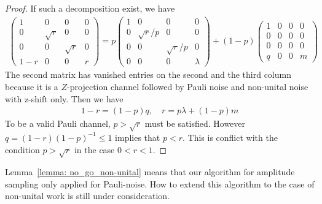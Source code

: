 \documentclass[aps]{revtex4-2}%
\begin{document}
\begin{proof}
    If such a decomposition exist, we have
    \begin{align}
        \begin{pmatrix}
            1&0&0&0\\
            0&\sqrt{r}&0&0\\
            0&0&\sqrt{r}&0\\
            1-r&0&0&r
        \end{pmatrix} =
        p\begin{pmatrix}
            1&0&0&0\\
            0&\sqrt{r}/p&0&0\\
            0&0&\sqrt{r}/p&0\\
            0&0&0&\lambda
        \end{pmatrix}
        +(1-p)
        \begin{pmatrix}
            1&0&0&0\\
            0&0&0&0\\
            0&0&0&0\\
            q&0&0&m
        \end{pmatrix}
    \end{align}
    The second matrix has vanished entries on the second and the third column because it is a $Z$-projection channel followed by Pauli noise and  non-unital noise with z-shift only. Then we have
    \begin{align}
        1 - r = (1 - p)q, \quad r= p \lambda + (1- p)m 
    \end{align}
    To be a valid Pauli channel, $p > \sqrt{r}$ must be satisfied.
    However $q = {(1 - r)}{(1 - p)}^{-1} \leq 1$ implies that $ p < r$. This is conflict with the condition $p > \sqrt{r}$ in the case $0<r<1$.    
    \end{proof}
    Lemma~\ref{lemma: no_go_non-unital} means that our algorithm for amplitude sampling only applied for Pauli-noise. How to extend this algorithm to the case of non-unital work is still under consideration. 
    
\end{document}
